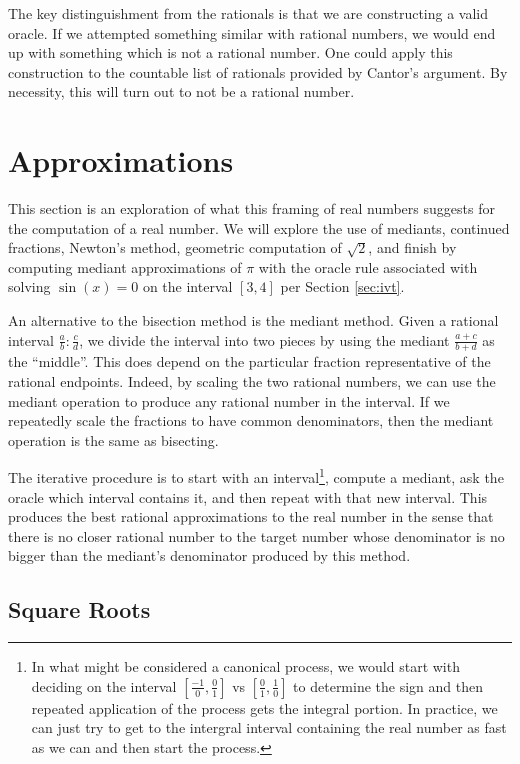 \documentclass[12pt]{article}
\begin{document}
The key distinguishment from the rationals is that we are constructing a valid oracle. If we attempted something similar with rational numbers, we would end up with something which is not a rational number. One could apply this construction to the countable list of rationals provided by Cantor's argument. By necessity, this will turn out to not be a rational number. 

\section{Approximations}\label{sec:mediant}

This section is an exploration of what this framing of real numbers suggests for the computation of a real number. We will explore the use of mediants, continued fractions, Newton's method, geometric computation of $\sqrt{2}$, and finish by computing mediant approximations of $\pi$ with the oracle  rule associated with solving $\sin(x)=0$ on the interval $[3,4]$ per Section \ref{sec:ivt}.

An alternative to the bisection method is the mediant method. Given a rational interval $\frac{a}{b} : \frac{c}{d}$, we divide the interval into two pieces by using the mediant $\frac{a+c}{b+d}$ as the ``middle''. This does depend on the particular fraction representative of the rational endpoints. Indeed, by scaling the two rational numbers, we can use the mediant operation to produce any rational number in the interval. If we repeatedly scale the fractions to have common denominators, then the mediant operation is the same as bisecting. 

The iterative procedure is to start with an interval\footnote{In what might be considered a canonical process, we would start with deciding on the interval $[\frac{-1}{0}, \frac{0}{1}]$ vs $[\frac{0}{1}, \frac{1}{0}]$ to determine the sign and then repeated application of the process gets the integral portion. In practice, we can just try to get to the intergral interval containing the real number as fast as we can and then start the process.}, compute a mediant, ask the oracle which interval contains it, and then repeat with that new interval. This produces the best rational approximations to the real number in the sense that there is no closer rational number to the target number whose denominator is no bigger than the mediant's denominator produced by this method. 


\subsection{Square Roots}
\end{document}
